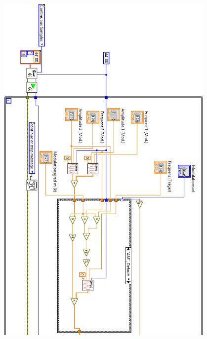 \newpage
\thispagestyle{empty}
\begin{figure}[H]
	\centering
	\includegraphics[width=0.95\textwidth]{pic/am1.png}
\end{figure} 

